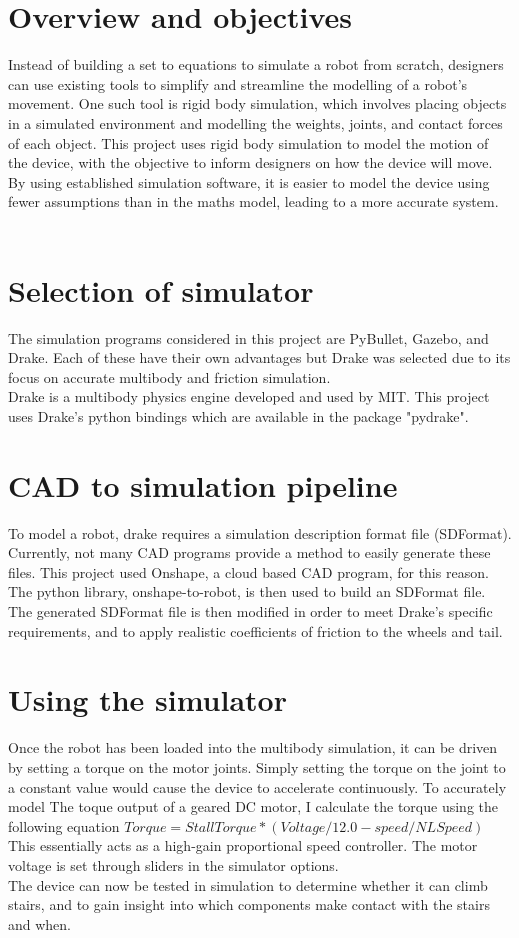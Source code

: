 \section{Overview and objectives}

Instead of building a set to equations to simulate a robot from scratch, designers can use existing tools to simplify and streamline the modelling of a robot's movement. One such tool is rigid body simulation, which involves placing objects in a simulated environment and modelling the weights, joints, and contact forces of each object. This project uses rigid body simulation to model the motion of the device, with the objective to inform designers on how the device will move. By using established simulation software, it is easier to model the device using fewer assumptions than in the maths model, leading to a more accurate system.\\
\\
\section{Selection of simulator}
The simulation programs considered in this project are PyBullet, Gazebo, and Drake. Each of these have their own advantages but Drake was selected due to its focus on accurate multibody and friction simulation.
\\
Drake is a multibody physics engine developed and used by MIT. This project uses Drake's python bindings which are available in the package "pydrake".\\
\section{CAD to simulation pipeline}
To model a robot, drake requires a simulation description format file (SDFormat). Currently, not many CAD programs provide a method to easily generate these files. This project used Onshape, a cloud based CAD program, for this reason. The python library, onshape-to-robot, is then used to build an SDFormat file. The generated SDFormat file is then modified in order to meet Drake's specific requirements, and to apply realistic coefficients of friction to the wheels and tail.\\

\section{Using the simulator}
Once the robot has been loaded into the multibody simulation, it can be driven by setting a torque on the motor joints. Simply setting the torque on the joint to a constant value would cause the device to accelerate continuously. To accurately model The toque output of a geared DC motor, I calculate the torque using the following equation
$Torque = StallTorque*(Voltage/12.0-speed/NLSpeed)$
This essentially acts as a high-gain proportional speed controller. The motor voltage is set through sliders in the simulator options. \\
The device can now be tested in simulation to determine whether it can climb stairs, and to gain insight into which components make contact with the stairs and when.\\
\\
